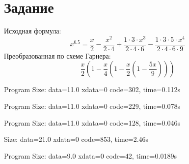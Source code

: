 
\isonefalse
\def \labnum {4}
\def \labsubj {Организация ЭВМ и систем}
\def \labauthor {Айтуганов Д. А. \\ Чебыкин И. Б.}
\def \labgroup {P3301}
\def \labinsp {Скорубский В. И.}
\def \labname {Вариант 3}

\isnametrue
\lstset{
	caption=\lstname,
	basicstyle=\ttfamily\selectfont\scriptsize
}


\section*{Задание}

Исходная формула:
$$x^{0.5} = \frac{x}{2} - \frac{x^2}{2\cdot4} + \frac{1\cdot3\cdot x^3}{2\cdot4\cdot6} - \frac{1\cdot3\cdot5\cdot x^4}{2\cdot4\cdot6\cdot9}$$
Преобразованная по схеме Гарнера:
$$\frac{x}{2}(1 - \frac{x}{4}(1 - \frac{x}{2}(1 - \frac{5x}{9})))$$

Program Size: data=11.0 xdata=0 code=302, time=0.112s


Program Size: data=11.0 xdata=0 code=229, time=0.078s


Program Size: data=11.0 xdata=0 code=128, time=0.046s


Size: data=21.0 xdata=0 code=853, time=2.46s


Program Size: data=9.0 xdata=0 code=42, time=0.0189s


